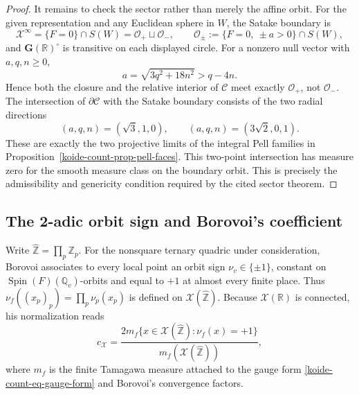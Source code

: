 \begin{proof}
It remains to check the sector rather than merely the affine orbit.  For the
given representation and any Euclidean sphere in \(W\), the Satake boundary
is
\begin{equation}
 \mathscr X^\infty=\{F=0\}\cap S(W)
 =\mathcal O_+\sqcup\mathcal O_-,
 \qquad
 \mathcal O_\pm:=\{F=0,\ \pm a>0\}\cap S(W),
 \label{koide-count-eq-satake-boundary}
\end{equation}
and \(\mathbf G(\mathbb R)^\circ\) is transitive on each displayed circle.
For a nonzero null vector with \(a,q,n\geq0\),
\[
 a=\sqrt{3q^2+18n^2}>q-4n.
\]
Hence both the closure and the relative interior of \(\mathcal C\) meet
exactly \(\mathcal O_+\), not \(\mathcal O_-\).  The intersection of
\(\partial\mathcal C\) with the Satake boundary consists of the two radial
directions
\begin{equation}
 (a,q,n)=(\sqrt3,1,0),
 \qquad
 (a,q,n)=(3\sqrt2,0,1).
 \label{koide-count-eq-sector-boundary-rays}
\end{equation}
These are exactly the two projective limits of the integral Pell families
in Proposition~\ref{koide-count-prop-pell-faces}.
This two-point intersection has measure zero for the smooth measure class
on the boundary orbit.
This is precisely the admissibility and genericity condition required by
the cited sector theorem.
\end{proof}

\subsection{The 2-adic orbit sign and Borovoi's coefficient}
\label{koide-count-subsec-borovoi}

Write $\widehat{\mathbb Z}=\prod_p\mathbb Z_p$.  For the nonsquare
ternary quadric under consideration, Borovoi associates to every local
point an orbit sign $\nu_v\in\{\pm1\}$, constant on
$\operatorname{Spin}(F)(\mathbb Q_v)$-orbits and equal to $+1$ at almost
every finite place.  Thus
$\nu_f((x_p)_p)=\prod_p\nu_p(x_p)$ is defined on
$\mathscr X(\widehat{\mathbb Z})$.  Because $\mathscr X(\mathbb R)$ is
connected, his normalization reads
\begin{equation}
 c_{\mathscr X}
 =\frac{2m_f\{x\in\mathscr X(\widehat{\mathbb Z}):\nu_f(x)=+1\}}
 {m_f(\mathscr X(\widehat{\mathbb Z}))},
 \label{koide-count-eq-borovoi-sign-definition}
\end{equation}
where $m_f$ is the finite Tamagawa measure attached to the gauge form
\eqref{koide-count-eq-gauge-form} and Borovoi's convergence factors.

